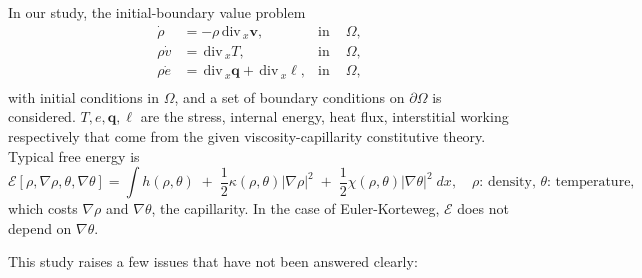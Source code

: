 \documentclass[a4paper,11pt]{article}
\def\div{\,\textrm{div}\,}
\def\E{\mathcal{E}}
\begin{document}
In our study, the initial-boundary value problem
\begin{equation}
\begin{aligned}
\dot{\rho} &=-\rho \div_x \mathbf{v}, & \text{in } & \Omega,\\
\rho\dot{v} &= \div_x T, & \text{in } & \Omega, \\
\rho\dot{e} &= \div_x \mathbf{q} + \div_x \mathbf{\ell}, & \text{in } & \Omega,\\
\end{aligned}
\end{equation}
with initial conditions in $\Omega$, and a set of boundary conditions on $\partial\Omega$ is considered. $T,e,\mathbf{q},\ell$ are the stress, internal energy, heat flux, interstitial working respectively that come from the given viscosity-capillarity constitutive theory. Typical free energy is
 \begin{equation} \label{eq:free}
  \E[\rho,\nabla\rho,\theta,\nabla\theta] = \int h(\rho,\theta) \;+\; \frac{1}{2}\kappa(\rho,\theta)|\nabla\rho|^2 \;+\; \frac{1}{2}\chi(\rho,\theta)|\nabla\theta|^2 \; dx, \quad \text{$\rho$: density, $\theta$: temperature},
 \end{equation}
which costs $\nabla\rho$ and $\nabla\theta$, the capillarity. In the case of Euler-Korteweg, $\E$ does not depend on $\nabla\theta$.

This study raises a few issues that have not been answered clearly:
\end{document}
